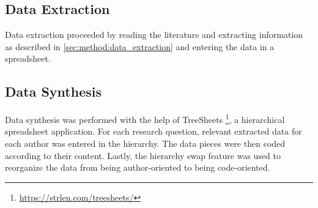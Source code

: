 \subsection{Data Extraction}
Data extraction proceeded by reading the literature and extracting information as described in \cref{sec:method:data_extraction} and entering the data in a spreadsheet.

\subsection{Data Synthesis}
Data synthesis was performed with the help of TreeSheets \footnote{\url{https://strlen.com/treesheets/}}, a hierarchical spreadsheet application.
For each research question, relevant extracted data for each author was entered in the hierarchy.
The data pieces were then coded according to their content.
Lastly, the hierarchy swap feature was used to reorganize the data from being author-oriented to being code-oriented.